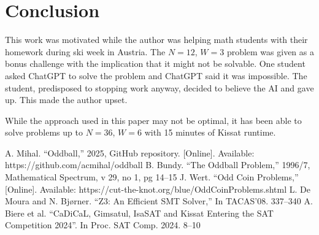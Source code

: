 \documentclass[conference]{IEEEtran}
\begin{document}
\section{Conclusion}

This work was motivated while the author was helping math students with their homework during ski week in Austria.
The $N=12$, $W=3$ problem was given as a bonus challenge with the implication that it might not be solvable.
One student asked ChatGPT to solve the problem and ChatGPT said it was impossible.
The student, predisposed to stopping work anyway, decided to believe the AI and gave up.
This made the author upset.

While the approach used in this paper may not be optimal, it has been able to solve problems up to $N=36$, $W=6$
with 15 minutes of Kissat runtime.

\begin{thebibliography}{0}
 A. Mihal. ``Oddball,'' 2025, GitHub repository. [Online]. Available: https://github.com/acmihal/oddball
 B. Bundy. ``The Oddball Problem,'' 1996/7, Mathematical Spectrum, v 29, no 1, pg 14--15
 J. Wert. ``Odd Coin Problems,'' [Online]. Available: https://cut-the-knot.org/blue/OddCoinProblems.shtml
 L. De Moura and N. Bj{\o}rner. ``Z3: An Efficient SMT Solver,'' In TACAS'08. 337--340
 A. Biere et al. ``CaDiCaL, Gimsatul, IsaSAT and Kissat Entering the SAT Competition 2024''. In Proc. SAT Comp. 2024. 8--10
\end{thebibliography}
\end{document}
